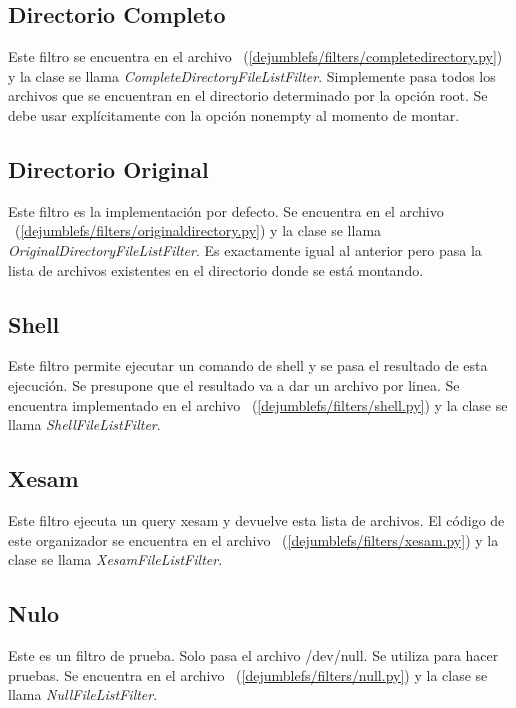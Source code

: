 \subsection{Directorio Completo}

Este filtro se encuentra en el archivo ~(\ref{dejumblefs/filters/completedirectory.py}) y la clase se llama \textit{CompleteDirectoryFileListFilter}. Simplemente pasa todos los archivos que se encuentran en el directorio determinado por la opción root. Se debe usar explícitamente con la opción nonempty al momento de montar.

\subsection{Directorio Original}

Este filtro es la implementación por defecto. Se encuentra en el archivo ~(\ref{dejumblefs/filters/originaldirectory.py}) y la clase se llama \textit{OriginalDirectoryFileListFilter}. Es exactamente igual al anterior pero pasa la lista de archivos existentes en el directorio donde se está montando.

\subsection{Shell}

Este filtro permite ejecutar un comando de shell y se pasa el resultado de esta ejecución. Se presupone que el resultado va a dar un archivo por linea. Se encuentra implementado en el archivo ~(\ref{dejumblefs/filters/shell.py}) y la clase se llama \textit{ShellFileListFilter}.

\subsection{Xesam}

Este filtro ejecuta un query xesam y devuelve esta lista de archivos. El código de este organizador se encuentra en el archivo ~(\ref{dejumblefs/filters/xesam.py}) y la clase se llama \textit{XesamFileListFilter}.

\subsection{Nulo}

Este es un filtro de prueba. Solo pasa el archivo /dev/null. Se utiliza para hacer pruebas. Se encuentra en el archivo ~(\ref{dejumblefs/filters/null.py}) y la clase se llama \textit{NullFileListFilter}.


